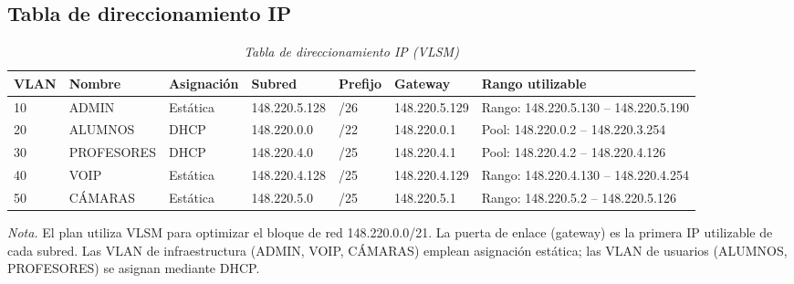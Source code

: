 \subsection{Tabla de direccionamiento IP}

\begin{table}[H]
	\caption{\textit{Tabla de direccionamiento IP (VLSM)}}
	\label{tab:direccionamiento_ip}
	\centering
	\begin{tabularx}{\textwidth}{l l l l l l X}
			\toprule
		VLAN & Nombre & Asignación & Subred & Prefijo & Gateway & Rango utilizable \\
		\midrule
		10 & ADMIN & Estática & 148.220.5.128 & /26 & 148.220.5.129 & Rango: 148.220.5.130 -- 148.220.5.190 \\
		20 & ALUMNOS & DHCP & 148.220.0.0 & /22 & 148.220.0.1 & Pool: 148.220.0.2 -- 148.220.3.254 \\
		30 & PROFESORES & DHCP & 148.220.4.0 & /25 & 148.220.4.1 & Pool: 148.220.4.2 -- 148.220.4.126 \\
		40 & VOIP & Estática & 148.220.4.128 & /25 & 148.220.4.129 & Rango: 148.220.4.130 -- 148.220.4.254 \\
		50 & CÁMARAS & Estática & 148.220.5.0 & /25 & 148.220.5.1 & Rango: 148.220.5.2 -- 148.220.5.126 \\
		\bottomrule
	\end{tabularx}
	\begin{flushleft}
			\textit{Nota.} El plan utiliza VLSM para optimizar el bloque de red 148.220.0.0/21. La puerta de enlace (gateway) es la primera IP utilizable de cada subred. Las VLAN de infraestructura (ADMIN, VOIP, CÁMARAS) emplean asignación estática; las VLAN de usuarios (ALUMNOS, PROFESORES) se asignan mediante DHCP.
	\end{flushleft}
\end{table}
